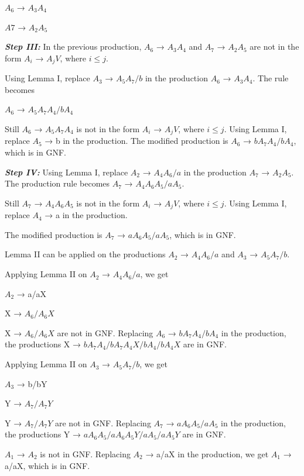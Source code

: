 \documentclass{article}
\begin{document}
\hspace*{5cm} $A_6$ → $A_3A_4$ 

\hspace*{5cm} $A 7$ → $A_2A_5$ 


\textit{\textbf{Step III:}} In the previous production, $A_6$ → $A_3A_4$ and $A_7$ → $A_2A_5$ are not in the form $A_i$ → $A_jV$, where $i \leq j$. 

Using Lemma I, replace $A_3$ → $A_5A_7/b$ in the production $A_6$ → $A_3A_4$. The rule becomes

\hspace*{5cm} $A_6$ → $A_5A_7A_4/bA_4$ 

Still $A_6$ → $A_5A_7A_4$ is not in the form $A_i$ → $A_jV$, where $i \leq j$. Using Lemma I, replace $A_5$ → b in the production. The modiﬁed production is $A_6$ → $bA_7A_4/bA_4$, which is in GNF. 

\textit{\textbf{Step IV:}} Using Lemma I, replace $A_2$ → $A_4A_6/a$ in the production $A_7$ → $A_2A_5$. The production rule becomes $A_7$ → $A_4A_6A_5/aA_5$.

Still $A_7$ → $A_4A_6A_5$ is not in the form $A_i$ → $A_jV$, where $i \leq j$. Using Lemma I, replace $A_4$ → a in the production. 

The modiﬁed production is $A_7$ → $aA_6A_5/aA_5$, which is in GNF. 

Lemma II can be applied on the productions $A_2$ → $A_4A_6/a$ and $A_3$ → $A_5A_7/b$. 

Applying Lemma II on $A_2$ → $A_4A_6/a$, we get 

\hspace*{5cm} $A_2$ → a/aX 

\hspace*{5cm} X → $A_6/A_6X$ 

X → $A_6/A_6X$ are not in GNF. Replacing $A_6$ → $bA_7A_4/bA_4$ in the production, the productions X → $bA_7A_4/bA_7A_4X/bA_4/bA_4X$ are in GNF. 

Applying Lemma II on $A_3$ → $A_5A_7/b$, we get 

\hspace*{5cm} $A_3$ → b/bY 

\hspace*{5cm} Y → $A_7/A_7Y$ 

Y → $A_7/A_7Y$ are not in GNF. Replacing $A_7$ → $aA_6A_5/aA_5$ in the production, the productions Y → $aA_6A_5/aA_6A_5Y/aA_5/aA_5Y$ are in GNF. 

$A_1$ → $A_2$ is not in GNF. Replacing $A_2$ → a/aX in the production, we get $A_1$ → a/aX, which is in GNF. 
\end{document}

